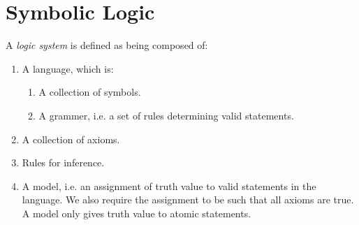 \section{Symbolic Logic}
\begin{definition}\label{def:logic}
  A \textit{logic system} is defined as being composed of:
  \begin{enumerate}
    \item A language, which is:
      \begin{enumerate}
        \item A collection of symbols.
        \item A grammer, i.e. a set of rules determining valid statements.
      \end{enumerate}
    \item A collection of axioms.
    \item Rules for inference.
    \item A model, i.e. an assignment of truth value to valid statements in the language. We also require the assignment to be such that all axioms are true. A model only gives truth value to atomic statements.
  \end{enumerate}
\end{definition}
